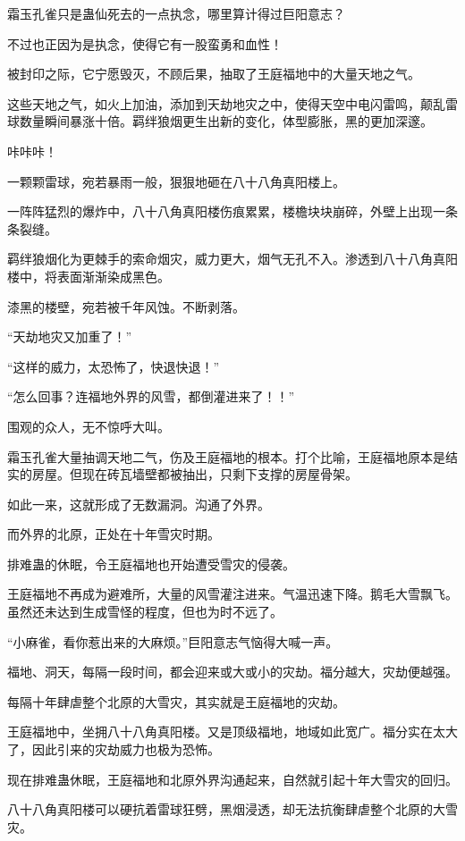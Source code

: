 \begin{this_body}
霜玉孔雀只是蛊仙死去的一点执念，哪里算计得过巨阳意志？

不过也正因为是执念，使得它有一股蛮勇和血性！

被封印之际，它宁愿毁灭，不顾后果，抽取了王庭福地中的大量天地之气。

这些天地之气，如火上加油，添加到天劫地灾之中，使得天空中电闪雷鸣，颠乱雷球数量瞬间暴涨十倍。羁绊狼烟更生出新的变化，体型膨胀，黑的更加深邃。

咔咔咔！

一颗颗雷球，宛若暴雨一般，狠狠地砸在八十八角真阳楼上。

一阵阵猛烈的爆炸中，八十八角真阳楼伤痕累累，楼檐块块崩碎，外壁上出现一条条裂缝。

羁绊狼烟化为更棘手的索命烟灾，威力更大，烟气无孔不入。渗透到八十八角真阳楼中，将表面渐渐染成黑色。

漆黑的楼壁，宛若被千年风蚀。不断剥落。

“天劫地灾又加重了！”

“这样的威力，太恐怖了，快退快退！”

“怎么回事？连福地外界的风雪，都倒灌进来了！！”

围观的众人，无不惊呼大叫。

霜玉孔雀大量抽调天地二气，伤及王庭福地的根本。打个比喻，王庭福地原本是结实的房屋。但现在砖瓦墙壁都被抽出，只剩下支撑的房屋骨架。

如此一来，这就形成了无数漏洞。沟通了外界。

而外界的北原，正处在十年雪灾时期。

排难蛊的休眠，令王庭福地也开始遭受雪灾的侵袭。

王庭福地不再成为避难所，大量的风雪灌注进来。气温迅速下降。鹅毛大雪飘飞。虽然还未达到生成雪怪的程度，但也为时不远了。

“小麻雀，看你惹出来的大麻烦。”巨阳意志气恼得大喊一声。

福地、洞天，每隔一段时间，都会迎来或大或小的灾劫。福分越大，灾劫便越强。

每隔十年肆虐整个北原的大雪灾，其实就是王庭福地的灾劫。

王庭福地中，坐拥八十八角真阳楼。又是顶级福地，地域如此宽广。福分实在太大了，因此引来的灾劫威力也极为恐怖。

现在排难蛊休眠，王庭福地和北原外界沟通起来，自然就引起十年大雪灾的回归。

八十八角真阳楼可以硬抗着雷球狂劈，黑烟浸透，却无法抗衡肆虐整个北原的大雪灾。


\end{this_body}
